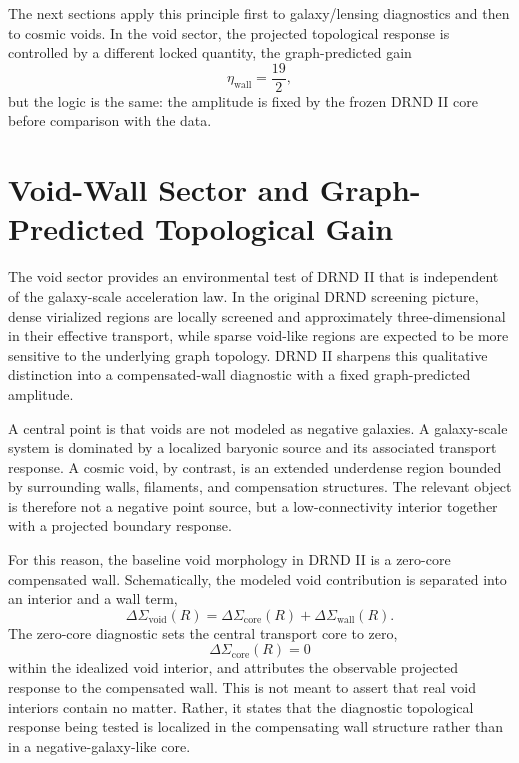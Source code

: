 \documentclass[12pt]{iopart}
\begin{document}
The next sections apply this principle first to galaxy/lensing diagnostics and then to cosmic voids. In the void sector, the projected topological response is controlled by a different locked quantity, the graph-predicted gain
\begin{equation}
\eta_{\mathrm{wall}}=\frac{19}{2},
\end{equation}
but the logic is the same: the amplitude is fixed by the frozen DRND II core before comparison with the data.

\section{Void-Wall Sector and Graph-Predicted Topological Gain}
\label{sec:void_wall}

The void sector provides an environmental test of DRND II that is independent of the galaxy-scale acceleration law. In the original DRND screening picture, dense virialized regions are locally screened and approximately three-dimensional in their effective transport, while sparse void-like regions are expected to be more sensitive to the underlying graph topology. DRND II sharpens this qualitative distinction into a compensated-wall diagnostic with a fixed graph-predicted amplitude.

A central point is that voids are not modeled as negative galaxies. A galaxy-scale system is dominated by a localized baryonic source and its associated transport response. A cosmic void, by contrast, is an extended underdense region bounded by surrounding walls, filaments, and compensation structures. The relevant object is therefore not a negative point source, but a low-connectivity interior together with a projected boundary response.

For this reason, the baseline void morphology in DRND II is a zero-core compensated wall. Schematically, the modeled void contribution is separated into an interior and a wall term,
\begin{equation}
\Delta\Sigma_{\mathrm{void}}(R)
=
\Delta\Sigma_{\mathrm{core}}(R)
+
\Delta\Sigma_{\mathrm{wall}}(R).
\label{eq:void_decomposition}
\end{equation}
The zero-core diagnostic sets the central transport core to zero,
\begin{equation}
\Delta\Sigma_{\mathrm{core}}(R)=0
\end{equation}
within the idealized void interior, and attributes the observable projected response to the compensated wall. This is not meant to assert that real void interiors contain no matter. Rather, it states that the diagnostic topological response being tested is localized in the compensating wall structure rather than in a negative-galaxy-like core.
\end{document}
